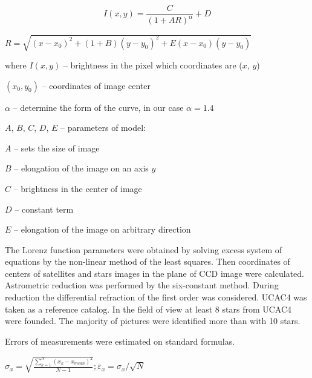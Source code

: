 \documentclass[]{article}
\begin{document}
\begin{equation}
\label{1}
I(x,y) = \frac{C}{(1 + AR)^{\alpha}} + D
\end{equation}
\begin{center}
\begin{math}
R = \sqrt{(x-x_0)^2 + (1+B)(y-y_0)^2 +E(x-x_0)(y-y_0)}
\end{math}\\
\end{center}
where
$I(x,y)$ -- brightness in the pixel which coordinates are ($x$, $y$)\par
$(x_0, y_0)$ -- coordinates of image center\par
$\alpha$ --  determine the form of the curve, in our case $\alpha = 1.4$\par
$A$, $B$, $C$, $D$, $E$ -- parameters of model:\par
$A$ -- sets the size of image\par
$B$ -- elongation of the image on an axis $y$\par
$C$ -- brightness in the center of image\par
$D$ -- constant term\par
$E$ -- elongation of the image on arbitrary direction\par
\vskip0.1cm

The Lorenz function parameters were obtained by solving excess system of equations by the non-linear method of the least squares. Then coordinates of centers of satellites and stars images in the plane of CCD image were calculated. Astrometric reduction was performed by the six-constant method. During reduction the differential refraction of the first order was considered. UCAC4 \cite{9} was taken as a reference catalog. In the field of view at least 8 stars from UCAC4 were founded. The majority of pictures were identified more than with 10 stars. \par
Errors of measurements were estimated on standard formulas.

\begin{math}
\sigma_x = \sqrt{\frac{\sum\limits_{k=1}^{N}(x_k-x_{mean})^2}{N-1}}; \varepsilon_x = \sigma_x/\sqrt{N}
\end{math}\\
\end{document}
